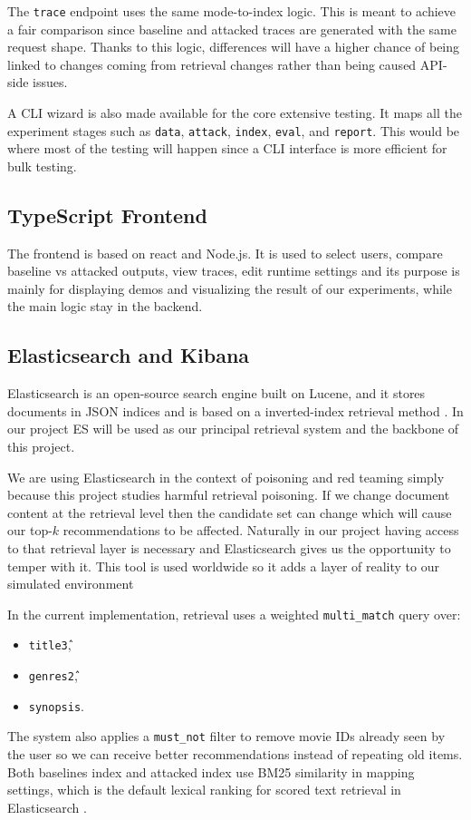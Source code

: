 The \texttt{trace} endpoint uses the same mode-to-index logic. This is meant to achieve a fair comparison since baseline and attacked traces are generated with the same request shape. Thanks to this logic, differences will have a higher chance of being linked to changes coming from retrieval changes rather than being caused API-side issues.

A CLI wizard is also made available for the core extensive testing. It maps all the experiment stages such as \texttt{data}, \texttt{attack}, \texttt{index}, \texttt{eval}, and \texttt{report}. This would be where most of the testing will happen since a CLI interface is more efficient for bulk testing.

\subsection{TypeScript Frontend}

The frontend is based on react and Node.js. It is used to select users, compare baseline vs attacked outputs, view traces, edit runtime settings and its purpose is mainly for displaying demos and visualizing the result of our experiments, while the main logic stay in the backend.

\subsection{Elasticsearch and Kibana}

Elasticsearch is an open-source search engine built on Lucene, and it stores documents in JSON indices and is based on a inverted-index retrieval method \cite{elastic_docs_es}.  In our project ES will be used as our principal retrieval system and the backbone of this project.

We are using Elasticsearch in the context of poisoning and red teaming simply because this project studies harmful retrieval poisoning. If we change document content at the retrieval level then the candidate set can change which will cause our top-$k$ recommendations to be affected. Naturally in our project having access to that retrieval layer is necessary and Elasticsearch gives us the opportunity to temper with it. This tool is used worldwide so it adds a layer of reality to our simulated environment 

In the current implementation, retrieval uses a weighted \texttt{multi\_match} query over:
\begin{itemize}
  \item \texttt{title\^3},
  \item \texttt{genres\^2},
  \item \texttt{synopsis}.
\end{itemize}
The system also applies a \texttt{must\_not} filter to remove movie IDs already seen by the user so we can receive better recommendations instead of repeating old items. Both baselines index and attacked index use BM25 similarity in mapping settings, which is the default lexical ranking for scored text retrieval in Elasticsearch \cite{elastic_docs_es}.

